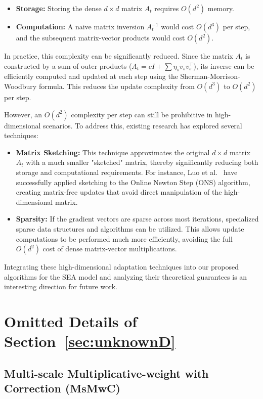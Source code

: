 \documentclass{article}
\renewcommand{\citet}{\citep}
\theoremstyle{plain}
\theoremstyle{definition}
\theoremstyle{remark}
\begin{document}
\begin{itemize}
    \item \textbf{Storage:} Storing the dense $d \times d$ matrix $A_t$ requires $O(d^2)$ memory.
    \item \textbf{Computation:} A naive matrix inversion $A_t^{-1}$ would cost $O(d^3)$ per step, and the subsequent matrix-vector products would cost $O(d^2)$.
\end{itemize}

In practice, this complexity can be significantly reduced. Since the matrix $A_t$ is constructed by a sum of outer products ($A_t = cI + \sum \eta_s v_s v_s^\top$), its inverse can be efficiently computed and updated at each step using the Sherman-Morrison-Woodbury formula. This reduces the update complexity from $O(d^3)$ to $O(d^2)$ per step.

However, an $O(d^2)$ complexity per step can still be prohibitive in high-dimensional scenarios. To address this, existing research has explored several techniques:
\begin{itemize}
    \item \textbf{Matrix Sketching:} This technique approximates the original $d \times d$ matrix $A_t$ with a much smaller "sketched" matrix, thereby significantly reducing both storage and computational requirements. For instance, Luo et al.~\citet{luo2016efficient} have successfully applied sketching to the Online Newton Step (ONS) algorithm, creating matrix-free updates that avoid direct manipulation of the high-dimensional matrix.
    \item \textbf{Sparsity:} If the gradient vectors are sparse across most iterations, specialized sparse data structures and algorithms can be utilized. This allows update computations to be performed much more efficiently, avoiding the full $O(d^2)$ cost of dense matrix-vector multiplications.
\end{itemize}
Integrating these high-dimensional adaptation techniques into our proposed algorithms for the SEA model and analyzing their theoretical guarantees is an interesting direction for future work.



\section{Omitted Details of Section~\ref{sec:unknownD}}\label{app:sec31}

\subsection{Multi-scale Multiplicative-weight with Correction (MsMwC)}\label{app:msmwc}
\end{document}

